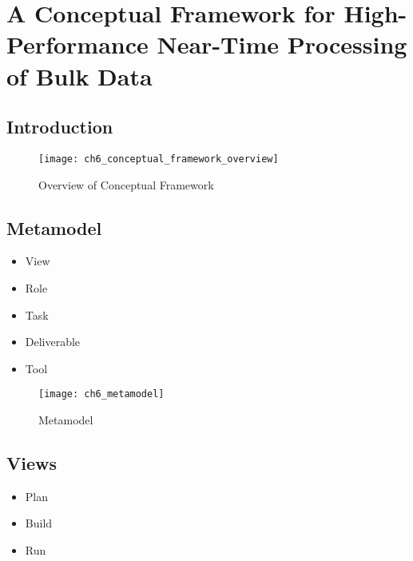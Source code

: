 

\chapter[Conceptual Framework]{A Conceptual Framework for High-Performance Near-Time Processing of Bulk Data}\label{ch:conceptual_framework}


\section{Introduction} 
\begin{figure}
	[htpb] \centering 
	\texttt{[image: ch6\_conceptual\_framework\_overview]} \caption{Overview of Conceptual Framework} \label{fig:ch6_conceptional_framework_overview} 
\end{figure}

\section{Metamodel} 
\begin{itemize}
	\item View
	\item Role
	\item Task
	\item Deliverable
	\item Tool
\end{itemize}

\begin{figure}
	[htpb] \centering 
	\texttt{[image: ch6\_metamodel]} 
	\caption{Metamodel} 
	\label{fig:ch6_metamodel} 
\end{figure}

\section{Views}
\begin{itemize}
	\item Plan
	\item Build
	\item Run
\end{itemize}

